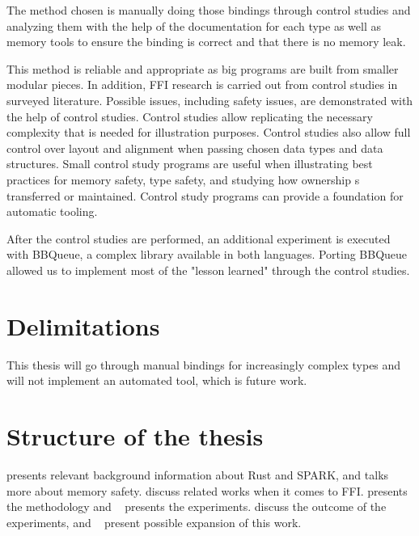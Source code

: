 \documentclass[nomenclature, english, bibtex]{kththesis}
\begin{document}
The method chosen is manually doing those bindings through control studies and analyzing them with the help of the documentation for each type as well as memory tools to ensure the binding is correct and that there is no memory leak. 

This method is reliable and appropriate as big programs are built from smaller modular pieces. In addition, \gls{FFI} research is carried out from control studies in surveyed literature. Possible issues, including safety issues, are demonstrated with the help of control studies. Control studies allow replicating the necessary complexity that is needed for illustration purposes. Control studies also allow full control over layout and alignment when passing chosen data types and data structures.
Small control study programs are useful when illustrating best practices for memory safety, type safety, and studying how ownership s transferred or maintained.
Control study programs can provide a foundation for automatic tooling.

After the control studies are performed, an additional experiment is executed with BBQueue, a complex library available in both languages. Porting BBQueue allowed us to implement most of the "lesson learned" through the control studies.


\section{Delimitations}


This thesis will go through manual bindings for increasingly complex types and will not implement an automated tool, which is future work.

\section{Structure of the thesis}

 presents relevant background information about Rust and SPARK, and talks more about memory safety.  discuss related works when it comes to \gls{FFI}.  presents the methodology and ~ presents the experiments.  discuss the outcome of the experiments, and ~ present possible expansion of this work.


\end{document}
